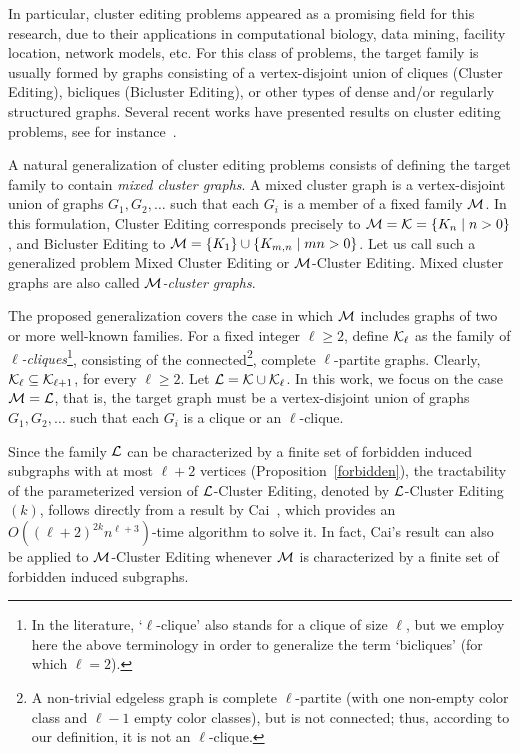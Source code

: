 \documentclass[12pt]{article}
\def\M{{\cal M}}
\def\L{{\cal L}}
\def\KL{{\cal K}_{\ell}}
\begin{document}
In particular, cluster editing problems appeared as a promising
field for this research, due to their applications in
computational biology, data mining, facility location, network
models, etc. For this class of problems, the target family
is usually formed by graphs consisting of a vertex-disjoint union
of cliques ({\sc Cluster Editing}), bicliques ({\sc Bicluster Editing}), or other types of dense and/or regularly structured
graphs. Several recent works have presented results on cluster editing problems,
see for instance~\cite{TBGEP2004,CM2011,DSPS2006,DSPS2009,FLRS2007,GGHN2003,G2007,YZ2007,SST2004}.

A natural generalization of cluster editing problems consists of
defining the target family to contain {\em mixed cluster graphs}. A mixed cluster graph is
a vertex-disjoint union of graphs $G_1, G_2, \ldots$
such that each $G_i$ is a member of a fixed family $\M$.
In this formulation, {\sc Cluster Editing} corresponds precisely to
$\M = {\cal K} = \{K_n \mid n > 0\}$, and {\sc Bicluster Editing} to
$\M = \{K_1\} \cup \{K_{m,n} \mid mn > 0\}$. Let us call such
a generalized problem {\sc Mixed Cluster Editing} or $\M${\sc -Cluster Editing}.
Mixed cluster graphs are also called $\M${\em -cluster graphs}.

The proposed generalization covers the case in which $\M$
includes graphs of two or more well-known families. For a fixed integer
$\ell \geq 2$, define $\KL$ as the family of {\em
$\ell$-cliques}\footnote{In the literature, `$\ell$-clique' also stands for a clique of size $\ell$,
but we employ here the above terminology in order to generalize
the term `bicliques' (for which $\ell=2$).}, consisting of the connected\footnote{A non-trivial edgeless graph is complete $\ell$-partite (with one non-empty color class
and $\ell-1$ empty color classes), but is not connected; thus, according to our definition, it is not an $\ell$-clique.}, complete $\ell$-partite
graphs.
Clearly, $\KL \subseteq {\cal K}_{\ell+1}$, for every $\ell \geq 2$.
Let $\L={\cal K} \cup \KL$.
In this work, we focus on the case $\M=\L$,
that is, the target graph must be a vertex-disjoint union of graphs $G_1, G_2, \ldots$
such that each $G_i$ is a clique or an ${\ell}$-clique.

Since the family $\L$ can be characterized by a finite set of forbidden induced subgraphs
with at most $\ell+2$ vertices
(Proposition~\ref{forbidden}), the tractability of the parameterized version of
$\L${\sc -Cluster Editing}, denoted by $\L${\sc-Cluster Editing}$(k)$,
follows directly from a result by Cai~\cite{C1996}, which provides an $O({(\ell+2)}^{2k}n^{\ell+3})$-time
algorithm to solve it. In fact, Cai's result can also be applied
to $\M${\sc -Cluster Editing} whenever $\M$ is characterized
by a finite set of forbidden induced subgraphs.
\end{document}
